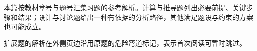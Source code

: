 本篇按教材章号与题号汇集习题的参考解析。计算与推导题列出必要前提、关键步骤和结果；设计与讨论题给出一种有依据的分析路径，其他满足题设与约束的方案也可能成立。

\optional 扩展题的解析在外侧页边沿用原题的危险弯道标记，表示首次阅读可暂时跳过。

\printsolutions
